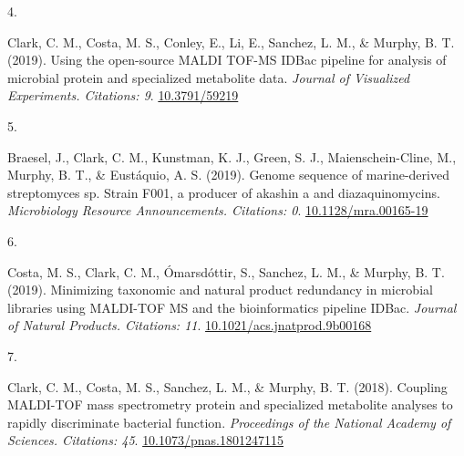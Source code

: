 \documentclass[10pt,a4paper,]{article}
\newlength{\cslhangindent}
\newlength{\csllabelwidth}
\newcommand{\CSLLeftMargin}[1]{\parbox[t]{\csllabelwidth}{\hfill #1~}}
\newcommand{\CSLRightInline}[1]{\parbox[t]{\linewidth - \cslhangindent - \csllabelwidth}{#1}\vspace{0.8ex}}
\begin{document}
\leavevmode{}%
\CSLLeftMargin{4. }
\CSLRightInline{Clark, C. M., Costa, M. S., Conley, E., Li, E., Sanchez,
L. M., \& Murphy, B. T. (2019). Using the open-source MALDI TOF-MS IDBac
pipeline for analysis of microbial protein and specialized metabolite
data. \emph{Journal of Visualized Experiments. Citations: 9}.
\href{https://10.3791/59219}{10.3791/59219}}

\leavevmode{}%
\CSLLeftMargin{5. }
\CSLRightInline{Braesel, J., Clark, C. M., Kunstman, K. J., Green, S.
J., Maienschein-Cline, M., Murphy, B. T., \& Eustáquio, A. S. (2019).
Genome sequence of marine-derived streptomyces sp. Strain F001, a
producer of akashin a and diazaquinomycins. \emph{Microbiology Resource
Announcements. Citations: 0}.
\href{https://10.1128/mra.00165-19}{10.1128/mra.00165-19}}

\leavevmode{}%
\CSLLeftMargin{6. }
\CSLRightInline{Costa, M. S., Clark, C. M., Ómarsdóttir, S., Sanchez, L.
M., \& Murphy, B. T. (2019). Minimizing taxonomic and natural product
redundancy in microbial libraries using MALDI-TOF MS and the
bioinformatics pipeline IDBac. \emph{Journal of Natural Products.
Citations: 11}.
\href{https://10.1021/acs.jnatprod.9b00168}{10.1021/acs.jnatprod.9b00168}}

\leavevmode{}%
\CSLLeftMargin{7. }
\CSLRightInline{Clark, C. M., Costa, M. S., Sanchez, L. M., \& Murphy,
B. T. (2018). Coupling MALDI-TOF mass spectrometry protein and
specialized metabolite analyses to rapidly discriminate bacterial
function. \emph{Proceedings of the National Academy of Sciences.
Citations: 45}.
\href{https://10.1073/pnas.1801247115}{10.1073/pnas.1801247115}}
\end{document}
